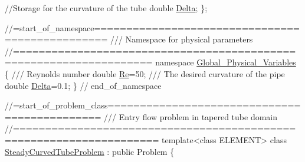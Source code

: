 \begin{DoxyCodeInclude}
 \textcolor{comment}{//Storage for the curvature of the tube}
 \textcolor{keywordtype}{double} \hyperlink{namespaceGlobal__Physical__Variables_add290b9e4a9c0e4c18a13faa7e29d857}{Delta};
\};

\textcolor{comment}{//=start\_of\_namespace================================================}\textcolor{comment}{}
\textcolor{comment}{/// Namespace for physical parameters}
\textcolor{comment}{}\textcolor{comment}{//===================================================================}
\textcolor{keyword}{namespace }\hyperlink{namespaceGlobal__Physical__Variables}{Global\_Physical\_Variables}
\{\textcolor{comment}{}
\textcolor{comment}{ /// Reynolds number}
\textcolor{comment}{} \textcolor{keywordtype}{double} \hyperlink{namespaceGlobal__Physical__Variables_ab814e627d2eb5bc50318879d19ab16b9}{Re}=50;
 \textcolor{comment}{}
\textcolor{comment}{ /// The desired curvature of the pipe}
\textcolor{comment}{} \textcolor{keywordtype}{double} \hyperlink{namespaceGlobal__Physical__Variables_add290b9e4a9c0e4c18a13faa7e29d857}{Delta}=0.1;
\} \textcolor{comment}{// end\_of\_namespace}


\textcolor{comment}{//=start\_of\_problem\_class=============================================}\textcolor{comment}{}
\textcolor{comment}{/// Entry flow problem in tapered tube domain}
\textcolor{comment}{}\textcolor{comment}{//====================================================================}
\textcolor{keyword}{template}<\textcolor{keyword}{class} ELEMENT>
\textcolor{keyword}{class }\hyperlink{classSteadyCurvedTubeProblem}{SteadyCurvedTubeProblem} : \textcolor{keyword}{public} Problem
\{


\end{DoxyCodeInclude}
